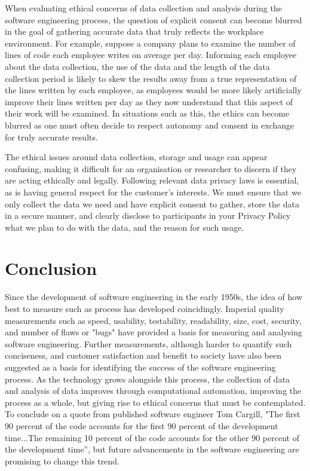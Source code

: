 \documentclass{article}
\begin{document}
When evaluating ethical concerns of data collection and analysis during the software engineering process, the question of explicit consent can become blurred in the goal of gathering accurate data that truly reflects the workplace environment. For example, suppose a company plans to examine the number of lines of code each employee writes on average per day. Informing each employee about the data collection, the use of the data and the length of the data collection period is likely to skew the results away from a true representation of the lines written by each employee, as employees would be more likely artificially improve their lines written per day as they now understand that this aspect of their work will be examined. In situations such as this, the ethics can become blurred as one must often decide to respect autonomy and consent in exchange for truly accurate results. \newline

The ethical issues around data collection, storage and usage can appear confusing, making it difficult for an organisation or researcher to discern if they are acting ethically and legally. Following relevant data privacy laws is essential, as is having general respect for the customer’s interests. We must ensure that we only collect the data we need and have explicit consent to gather, store the data in a secure manner, and clearly disclose to participants in your Privacy Policy what we plan to do with the data, and the reason for such usage.  \newline

\section{Conclusion} Since the development of software engineering in the early 1950s, the idea of how best to measure such as process has developed coincidingly. Imperial quality measurements such as speed, usability, testability, readability, size, cost, security, and number of flaws or "bugs" have provided a basis for measuring and analysing software engineering. Further measurements, although harder to quantify such conciseness, and customer satisfaction and benefit to society have also been suggested as a basis for identifying the success of the software engineering process. As the technology grows alongside this process, the collection of data and analysis of data improves through computational automation, improving the process as a whole, but giving rise to ethical concerns that must be contemplated. To conclude on a quote from published software engineer Tom Cargill, "The first 90 percent of the code accounts for the first 90 percent of the development time...The remaining 10 percent of the code accounts for the other 90 percent of the development time'', but future advancements in the software engineering are promising to change this trend. 
\end{document}
